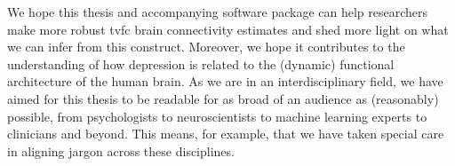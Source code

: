 We hope this thesis and accompanying software package can help researchers make more robust \gls{tvfc} brain connectivity estimates and shed more light on what we can infer from this construct.
Moreover, we hope it contributes to the understanding of how depression is related to the (dynamic) functional architecture of the human brain.
%
As we are in an interdisciplinary field, we have aimed for this thesis to be readable for as broad of an audience as (reasonably) possible, from psychologists to neuroscientists to machine learning experts to clinicians and beyond.
This means, for example, that we have taken special care in aligning jargon across these disciplines.
